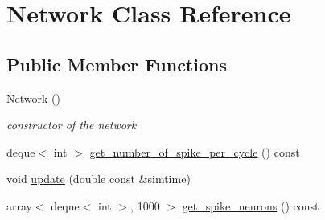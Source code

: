 \hypertarget{class_network}{}\section{Network Class Reference}
\label{class_network}
\subsection*{Public Member Functions}
\begin{DoxyCompactItemize}
\item 
\mbox{\label{class_network_a3cc2fb4f8fa4d507077e8da85ce5a1c8}} 
\hyperlink{class_network_a3cc2fb4f8fa4d507077e8da85ce5a1c8}{Network} ()
\begin{DoxyCompactList}\small\item\em constructor of the network \end{DoxyCompactList}\item 
deque$<$ int $>$ \hyperlink{class_network_acc8227556c922215947eb3d88fcf2161}{get\+\_\+number\+\_\+of\+\_\+spike\+\_\+per\+\_\+cycle} () const
\item 
void \hyperlink{class_network_ad9c58cb65b33316b93804ed59c3c35ab}{update} (double const \&simtime)
\item 
array$<$ deque$<$ int $>$, 1000 $>$ \hyperlink{class_network_aa091395c56fe860d89c10b605e227727}{get\+\_\+spike\+\_\+neurons} () const
\end{DoxyCompactItemize}
